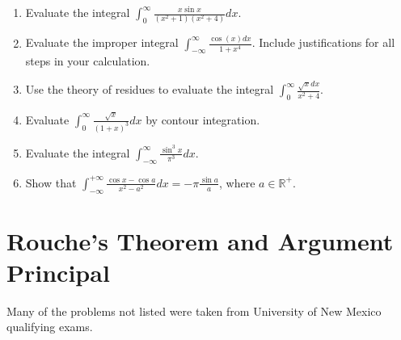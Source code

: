 \documentclass[a4paper,10pt]{article}
\begin{document}
\begin{enumerate}
	
	\item Evaluate the integral $\int_{0}^{\infty}\frac{x \sin x}{(x^{2}+1)(x^{2}+4)}dx$.
	
	\item Evaluate the improper integral $\int_{-\infty}^{\infty}\frac{\cos(x)dx}{1+x^{4}}$. Include justifications for all steps in your calculation.
	
	\item Use the theory of residues to evaluate the integral $\int_{0}^{\infty}\frac{\sqrt{x}dx}{x^{2}+4}$.

	\item Evaluate $\int_{0}^{\infty}\frac{\sqrt{x}}{(1+x)^{3}}dx$ by contour integration.
	
	\item Evaluate the integral $\int_{-\infty}^{\infty}\frac{\sin^{3}x}{\pi^{3}}dx$.
	

	
	\item Show that $\int_{-\infty}^{+\infty}\frac{\cos x - \cos a}{x^{2}-a^{2}}dx = -\pi\frac{\sin a}{a}$, where $a \in \mathbb{R}^{+}$.
	
\end{enumerate}

\section{Rouche's Theorem and Argument Principal}

Many of the problems not listed were taken from University of New Mexico qualifying exams. 
\end{document}
